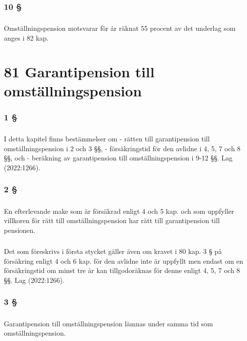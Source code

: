 \documentclass[a4paper,notitlepage,openany,10pt]{book}
\begin{document}
\subsection*{10 §}
\paragraph*{}
Omställningspension motsvarar för år räknat 55 procent av det underlag som anges i 82 kap.
\chapter*{81 Garantipension till omställningspension}
\subsection*{1 §}
\paragraph*{}
I detta kapitel finns bestämmelser om
\newline - rätten till garantipension till omställningspension i 2 och 3 §§,
\newline - försäkringstid för den avlidne i 4, 5, 7 och 8 §§, och
\newline - beräkning av garantipension till omställningspension i 9-12 §§.
Lag (2022:1266).
\subsection*{2 §}
\paragraph*{}
En efterlevande make som är försäkrad enligt 4 och 5 kap. och som uppfyller villkoren för rätt till omställningspension har rätt till garantipension till pensionen.
\paragraph*{}
Det som föreskrivs i första stycket gäller även om kravet i 80 kap. 3 § på försäkring enligt 4 och 6 kap. för den avlidne inte är uppfyllt men endast om en försäkringstid om minst tre år kan tillgodoräknas för denne enligt 4, 5, 7 och 8 §§.
Lag (2022:1266).
\subsection*{3 §}
\paragraph*{}
Garantipension till omställningspension lämnas under samma tid som omställningspension.
\end{document}
